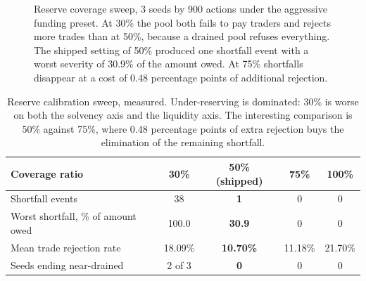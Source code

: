 \documentclass[11pt,a4paper]{article}
\begin{document}
\begin{figure}[h]
\centering
{}
\caption{Reserve coverage sweep, 3 seeds by 900 actions under the aggressive funding preset.
At 30\% the pool both fails to pay traders and rejects more trades than at 50\%, because a
drained pool refuses everything. The shipped setting of 50\% produced one shortfall event
with a worst severity of 30.9\% of the amount owed. At 75\% shortfalls disappear at a cost of
0.48 percentage points of additional rejection.}
\label{fig:calib}
\end{figure}

\begin{table}[h]
\centering
\small
\setlength{\tabcolsep}{8pt}
\renewcommand{\arraystretch}{1.25}
\begin{tabular}{@{}lcccc@{}}
\toprule
Coverage ratio & 30\% & \textbf{50\% (shipped)} & 75\% & 100\% \\
\midrule
Shortfall events & 38 & \textbf{1} & 0 & 0 \\
Worst shortfall, \% of amount owed & 100.0 & \textbf{30.9} & 0 & 0 \\
Mean trade rejection rate & 18.09\% & \textbf{10.70\%} & 11.18\% & 21.70\% \\
Seeds ending near-drained & 2 of 3 & \textbf{0} & 0 & 0 \\
\bottomrule
\end{tabular}
\caption{Reserve calibration sweep, measured. Under-reserving is dominated: 30\% is worse on
both the solvency axis and the liquidity axis. The interesting comparison is 50\% against
75\%, where 0.48 percentage points of extra rejection buys the elimination of the remaining
shortfall.}
\label{tab:calib}
\end{table}
\end{document}
